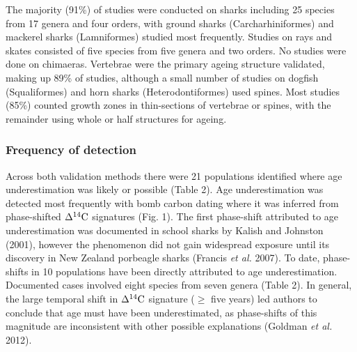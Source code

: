 \documentclass[]{article}
\begin{document}
The majority (91\%) of studies were conducted on sharks including 25
species from 17 genera and four orders, with ground sharks
(Carcharhiniformes) and mackerel sharks (Lamniformes) studied most
frequently. Studies on rays and skates consisted of five species from
five genera and two orders. No studies were done on chimaeras. Vertebrae
were the primary ageing structure validated, making up 89\% of studies,
although a small number of studies on dogfish (Squaliformes) and horn
sharks (Heterodontiformes) used spines. Most studies (85\%) counted
growth zones in thin-sections of vertebrae or spines, with the remainder
using whole or half structures for ageing.

\subsubsection{Frequency of detection}\label{frequency-of-detection}

Across both validation methods there were 21 populations identified
where age underestimation was likely or possible (Table 2). Age
underestimation was detected most frequently with bomb carbon dating
where it was inferred from phase-shifted \(\Delta^{14}\textup{C}\)
signatures (Fig. 1). The first phase-shift attributed to age
underestimation was documented in school sharks by Kalish and Johnston
(2001), however the phenomenon did not gain widespread exposure until
its discovery in New Zealand porbeagle sharks (Francis \emph{et al.}
2007). To date, phase-shifts in 10 populations have been directly
attributed to age underestimation. Documented cases involved eight
species from seven genera (Table 2). In general, the large temporal
shift in \(\Delta^{14}\textup{C}\) signature (\(\geq\) five years) led
authors to conclude that age must have been underestimated, as
phase-shifts of this magnitude are inconsistent with other possible
explanations (Goldman \emph{et al.} 2012).
\end{document}
